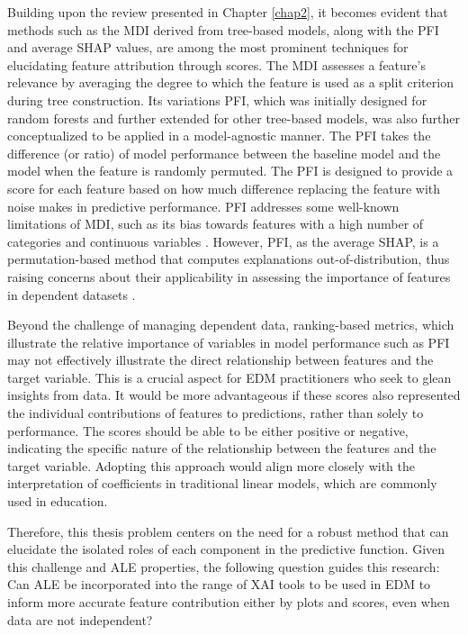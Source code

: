 Building upon the review presented in Chapter \ref{chap2}, it becomes evident that methods such as the \gls{MDI} derived from tree-based models, along with the \gls{PFI} and average \gls{SHAP} values, are among the most prominent techniques for elucidating feature attribution through scores. The \gls{MDI} assesses a feature's relevance by averaging the degree to which the feature is used as a split criterion during tree construction. Its variations \gls{PFI},  which was initially designed for random forests and further extended for other tree-based models, was also further conceptualized to be applied in a model-agnostic manner. The \gls{PFI} takes the difference (or ratio) of model performance between the baseline model and the model when the feature is randomly permuted. The \gls{PFI} is designed to provide a score for each feature based on how much diﬀerence replacing the feature with noise makes in predictive performance. \gls{PFI} addresses some well-known limitations of \gls{MDI}, such as its bias towards features with a high number of categories and continuous variables \cite{Li2019AForests}. However, \gls{PFI}, as the average \gls{SHAP}, is a permutation-based method that computes explanations out-of-distribution, thus raising concerns about their applicability in assessing the importance of features in dependent datasets \cite{Strobl2008ConditionalForests, Rudin2019StopInstead, Nembrini2019BiasRecommendations, Nicodemus2011LetterMeasures}. 

Beyond the challenge of managing dependent data, ranking-based metrics, which illustrate the relative importance of variables in model performance such as \gls{PFI} may not effectively illustrate the direct relationship between features and the target variable. This is a crucial aspect for \gls{EDM} practitioners who seek to glean insights from data. It would be more advantageous if these scores also represented the individual contributions of features to predictions, rather than solely to performance. The scores should be able to be either positive or negative, indicating the specific nature of the relationship between the features and the target variable. Adopting this approach would align more closely with the interpretation of coefficients in traditional linear models, which are commonly used in education.

Therefore, this thesis problem centers on the need for a robust method that can elucidate the isolated roles of each component in the predictive function. Given this challenge and \gls{ALE} properties, the following question guides this research: Can \gls{ALE} be incorporated into the range of \gls{XAI} tools to be used in \gls{EDM} to inform more accurate feature contribution either by plots and scores, even when data are not independent? 






